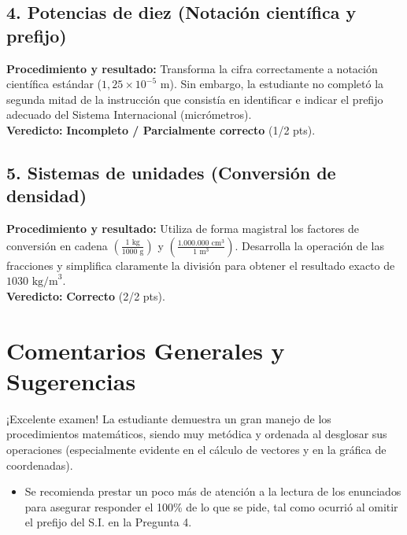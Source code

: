 \documentclass[12pt]{article}
\begin{document}
\subsection*{4. Potencias de diez (Notación científica y prefijo)}
\textbf{Procedimiento y resultado:} Transforma la cifra correctamente a notación científica estándar ($1,25 \times 10^{-5}$ m). Sin embargo, la estudiante no completó la segunda mitad de la instrucción que consistía en identificar e indicar el prefijo adecuado del Sistema Internacional (micrómetros). \\
\textbf{Veredicto:} \textbf{Incompleto / Parcialmente correcto} (1/2 pts).

\subsection*{5. Sistemas de unidades (Conversión de densidad)}
\textbf{Procedimiento y resultado:} Utiliza de forma magistral los factores de conversión en cadena $\left(\frac{1 \text{ kg}}{1000 \text{ g}}\right)$ y $\left(\frac{1.000.000 \text{ cm}^3}{1 \text{ m}^3}\right)$. Desarrolla la operación de las fracciones y simplifica claramente la división para obtener el resultado exacto de $1030 \text{ kg/m}^3$. \\
\textbf{Veredicto:} \textbf{Correcto} (2/2 pts).

\vspace{0.5cm}
\section*{Comentarios Generales y Sugerencias}
¡Excelente examen! La estudiante demuestra un gran manejo de los procedimientos matemáticos, siendo muy metódica y ordenada al desglosar sus operaciones (especialmente evidente en el cálculo de vectores y en la gráfica de coordenadas).
\begin{itemize}
    \item Se recomienda prestar un poco más de atención a la lectura de los enunciados para asegurar responder el 100\% de lo que se pide, tal como ocurrió al omitir el prefijo del S.I. en la Pregunta 4.
\end{itemize}
\end{document}
